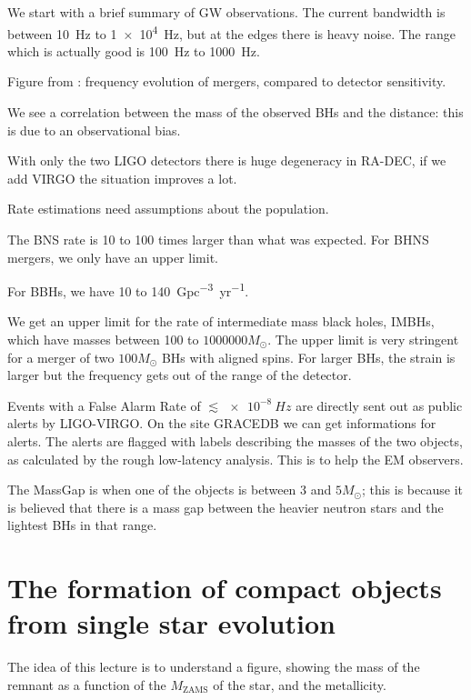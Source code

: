 \documentclass[main.tex]{subfiles}
\begin{document}

We start with a brief summary of GW observations. 
The current bandwidth is between \SI{10}{Hz} to \SI{1e4}{Hz}, but at the edges there is heavy noise. The range which is actually good is \SI{100}{Hz} to \SI{1000}{Hz}. 

Figure from \cite[]{ligoscientificcollaborationandvirgocollaborationBinaryBlackHole2016}: frequency evolution of mergers, compared to detector sensitivity. 

We see a correlation between the mass of the observed BHs and the distance: this is due to an observational bias. 

With only the two LIGO detectors there is huge degeneracy in RA-DEC, if we add VIRGO the situation improves a lot. 

Rate estimations need assumptions about the population.

The BNS rate is 10 to 100 times larger than what was expected. 
For BHNS mergers, we only have an upper limit. 

For BBHs, we have \num{10} to \SI{140}{Gpc^{-3} yr^{-1}}. 

We get an upper limit for the rate of intermediate mass black holes, IMBHs, which have masses between 100 to \(\num{1000000}M_{\odot}\). 
The upper limit is very stringent for a merger of two \(100M_{\odot}\) BHs with aligned spins. 
For larger BHs, the strain is larger but the frequency gets out of the range of the detector. 

Events with a False Alarm Rate of \(\lesssim \SI{e-8}{Hz}\) are directly sent out as public alerts by LIGO-VIRGO. 
On the site GRACEDB we can get informations for alerts. 
The alerts are flagged with labels describing the masses of the two objects, as calculated by the rough low-latency analysis. 
This is to help the EM observers. 

The MassGap is when one of the objects is between 3 and \(5 M_{\odot}\); this is because it is believed that there is a mass gap between the heavier neutron stars and the lightest BHs in that range. 

\chapter{The formation of compact objects from single star evolution}

The idea of this lecture is to understand a figure, showing the mass of the remnant as a function of the \(M _{\text{ZAMS}}\) of the star, and the metallicity. 
\end{document}
